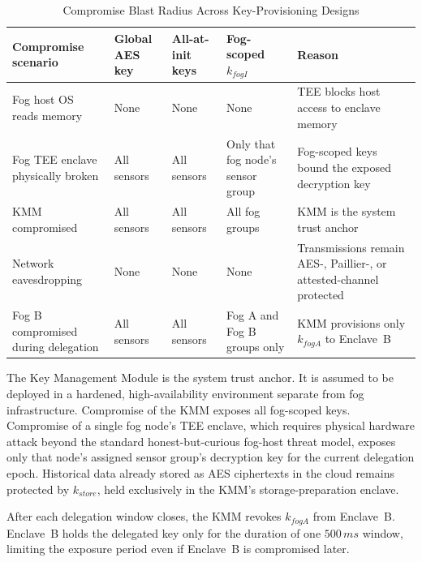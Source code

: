 \documentclass[conference]{IEEEtran}
\begin{document}
    \begin{table}[htbp]
    \caption{Compromise Blast Radius Across Key-Provisioning Designs}
    \label{table:trust-model}
    \centering
    \begingroup
    \setlength{\tabcolsep}{3pt}
    \renewcommand{\arraystretch}{1.15}
    \begin{tabular}{@{}>{\raggedright\arraybackslash}p{}>{\raggedright\arraybackslash}p{}>{\raggedright\arraybackslash}p{}>{\raggedright\arraybackslash}p{}>{\raggedright\arraybackslash}p{}@{}}
    \hline
    \textbf{Compromise scenario} & \textbf{Global AES key} & \textbf{All-at-init keys} & \textbf{Fog-scoped $k_{fogI}$} & \textbf{Reason} \\
    \hline
    Fog host OS reads memory & None & None & None & TEE blocks host access to enclave memory \\
    Fog TEE enclave physically broken & All sensors & All sensors & Only that fog node's sensor group & Fog-scoped keys bound the exposed decryption key \\
    KMM compromised & All sensors & All sensors & All fog groups & KMM is the system trust anchor \\
    Network eavesdropping & None & None & None & Transmissions remain AES-, Paillier-, or attested-channel protected \\
    Fog B compromised during delegation & All sensors & All sensors & Fog A and Fog B groups only & KMM provisions only $k_{fogA}$ to Enclave~B \\
    \hline
    \end{tabular}
    \endgroup
    \end{table}

    The Key Management Module is the system trust anchor. It is assumed to be deployed in a hardened, high-availability environment separate from fog infrastructure. Compromise of the KMM exposes all fog-scoped keys. Compromise of a single fog node's TEE enclave, which requires physical hardware attack beyond the standard honest-but-curious fog-host threat model, exposes only that node's assigned sensor group's decryption key for the current delegation epoch. Historical data already stored as AES ciphertexts in the cloud remains protected by $k_{store}$, held exclusively in the KMM's storage-preparation enclave.

    After each delegation window closes, the KMM revokes $k_{fogA}$ from Enclave~B. Enclave~B holds the delegated key only for the duration of one $500\,ms$ window, limiting the exposure period even if Enclave~B is compromised later.
\end{document}
